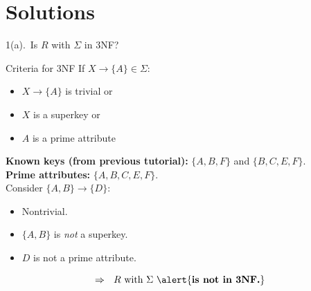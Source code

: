 \documentclass[UTF8]{beamer}
\begin{document}
\section{Solutions}

\begin{frame}{1(a).\ Is $R$ with $\Sigma$ in 3NF?}
\footnotesize
\pause
\begin{block}{Criteria for 3NF}
    If $X\to \{A\} \in \Sigma$:
    \begin{itemize}
        \item $X\to \{A\}$ is trivial \alert{or}
        \item $X$ is a superkey \alert{or}
        \item $A$ is a prime attribute
    \end{itemize}
\end{block}
\pause
\textbf{Known keys (from previous tutorial):} $\{A,B,F\}$ and $\{B,C,E,F\}$.\\
\textbf{Prime attributes:} $\{A,B,C,E,F\}$.\\
\pause
Consider $\{A,B\}\to\{D\}$:
\begin{itemize}\itemsep2pt
\pause
  \item Nontrivial.
\pause
  \item $\{A,B\}$ is \emph{not} a superkey.
\pause
  \item $D$ is not a prime attribute.
\end{itemize}
\pause
\[
\Rightarrow\ \ R\text{ with }\Sigma\ \alert{\textbf{is not in 3NF.}}
\]
\end{frame}
\end{document}
